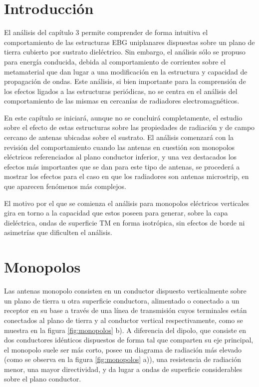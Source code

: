 

\section{Introducción}

El análisis del capítulo 3 permite comprender de forma intuitiva el comportamiento de las estructuras EBG uniplanares dispuestas sobre un plano de tierra cubierto por sustrato dieléctrico. Sin embargo, el análisis sólo se propuso para energía conducida, debida al comportamiento de corrientes sobre el metamaterial que dan lugar a una modificación en la estructura y capacidad de propagación de ondas. Este análisis, si bien importante para la comprensión de los efectos ligados a las estructuras periódicas, no se centra en el análisis del comportamiento de las mismas en cercanías de radiadores electromagnéticos.

En este capítulo se iniciará, aunque no se concluirá completamente, el estudio sobre el efecto de estas estructuras sobre las propiedades de radiación y de campo cercano de antenas ubicadas sobre el sustrato. El análisis comenzará con la revisión del comportamiento cuando las antenas en cuestión son monopolos eléctricos referenciados al plano conductor inferior, y una vez destacados los efectos más importantes que se dan para este tipo de antenas, se procederá a mostrar los efectos para el caso en que los radiadores son antenas microstrip, en que aparecen fenómenos más complejos.

El motivo por el que se comienza el análisis para monopolos eléctricos verticales gira en torno a la capacidad que estos poseen para generar, sobre la capa dieléctrica, ondas de superficie TM en forma isotrópica, sin efectos de borde ni asimetrías que dificulten el análisis.

\section{Monopolos}

Las antenas monopolo consisten en un conductor dispuesto verticalmente sobre un plano de tierra u otra superficie conductora, alimentado o conectado a un receptor en su base a través de una línea de transmisión cuyos terminales están conectados al plano de tierra y al conductor vertical respectivamente, como se muestra en la figura \ref{fig:monopolos} b). A diferencia del dipolo, que consiste en dos conductores idénticos dispuestos de forma tal que comparten su eje principal, el monopolo suele ser más corto, posee un diagrama de radiación más elevado (como se observa en la figura \ref{fig:monopolos} a)), una resistencia de radiación menor, una mayor directividad, y da lugar a ondas de superficie considerables sobre el plano conductor.


